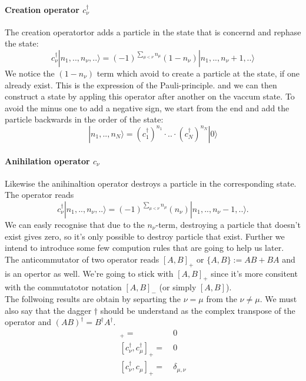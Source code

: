 \documentclass[../main.tex]{subfile}
\begin{document}
\paragraph{Creation operator $c_\nu^{\dagger}$}
The creation operatortor adds a particle in the state that is concernd and rephase the state:
\[
    c_{\nu}^{\dagger} |n_{1},..,n_{\nu},..\rangle = (-1)^{\sum_{\mu<\nu}n_{\mu}} (1-n_{\nu})|n_{1},..,n_{\nu}+1,..\rangle
\]
We notice the $ (1-n_{\nu})$ term which avoid to create a particle at the state, if one already exist. This is the expression of
the Pauli-principle. 
and we can then construct a state by appling this operator after another on the vaccum state. To avoid the minus one to add a negative sign, we start from the 
end and add the particle backwards in the order of the state:
\[
    |n_{1},..,n_{N}\rangle = (c_{1}^{\dagger})^{n_{1}}\cdot ..\cdot (c_{N}^{\dagger})^{n_{N}} |0\rangle
\]  

\paragraph{Anihilation operator $c_\nu$}
Likewise the anihinaltion operator destroys a particle in the corresponding state. The operator reads
\[
    c_{\nu}^{\dagger} |n_{1},..,n_{\nu},..\rangle = (-1)^{\sum_{\mu<\nu}n_{\mu}} (n_{\nu})|n_{1},..,n_{\nu}-1,..\rangle.
\]
We can easly recognise that due to the $n_{\nu}$-term, destroying a particle that doesn't exist gives zero, 
so it's only possible to destroy particle that exist. Further we intend to introduce some few compution 
rules that are going to help us later. \\

The anticommutator of two operator reads $[A,B]_{+}$ or $\{A,B\} := AB + BA$ and is an opertor as well.
We're going to stick with $[A,B]_{+}$ since it's more consitent with the commutatotor notation $[A,B]_{-}$ (or simply $[A,B]$).\\

The follwoing results are obtain by separting the $\nu = \mu$ from the $\nu \neq \mu$. We must also say that the dagger $\dagger$ 
should be understand as the complex transpose of the operator and $(AB)^{\dagger} = B^{\dagger}A^{\dagger}$.
\begin{align*}
    [c_{\nu},c_{\mu}]_+ =&~ 0\\
    [c^{\dagger}_{\nu},c^{\dagger}_{\mu}]_+ =&~0\\
    [c^{\dagger}_{\nu},c_{\mu}]_+ =&~ \delta_{\mu,\nu}\\
\end{align*} 
\end{document}
